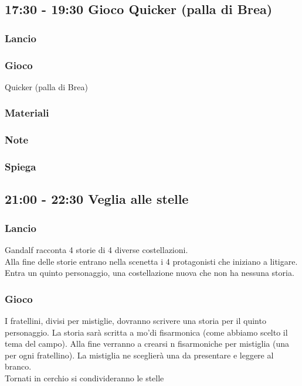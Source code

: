\documentclass[../main.tex]{subfiles}
\begin{document}
    \subsection{17:30 - 19:30 Gioco Quicker (palla di Brea)}
        \subsubsection{Lancio}
        \subsubsection{Gioco}
         Quicker (palla di Brea)
        \subsubsection{Materiali}
        \subsubsection{Note}
        \subsubsection{Spiega}

    \subsection{21:00 - 22:30 Veglia alle stelle}
        \subsubsection{Lancio}
        Gandalf racconta 4 storie di 4 diverse costellazioni.\\
        Alla fine delle storie entrano nella scenetta i 4 protagonisti che iniziano a litigare. Entra un quinto personaggio, una costellazione nuova che non ha nessuna storia.\\
        \subsubsection{Gioco}
        I fratellini, divisi per mistiglie, dovranno scrivere una storia per il quinto personaggio. La storia sarà scritta a mo'di fisarmonica (come abbiamo scelto il tema del campo).
        Alla fine verranno a crearsi n fisarmoniche per mistiglia (una per ogni fratellino). La mistiglia ne sceglierà una da presentare e leggere al branco.\\
        Tornati in cerchio si condivideranno le stelle
\end{document}
